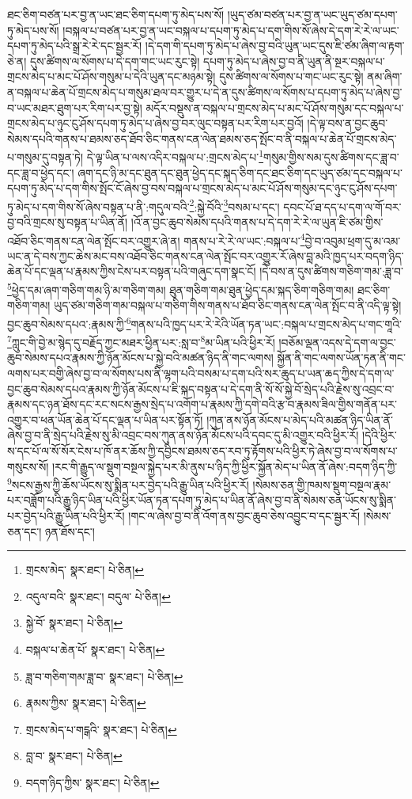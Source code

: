 ཐང་ཅིག་བཙན་པར་བྱ་ན་ཡང་ཐང་ཅིག་དཔག་ཏུ་མེད་པས་སོ། །ཡུད་ཙམ་བཙན་པར་བྱ་ན་ཡང་ཡུད་ཙམ་དཔག་ཏུ་མེད་པས་སོ། །བསྐལ་པ་བཙན་པར་བྱ་ན་ཡང་བསྐལ་པ་དཔག་ཏུ་མེད་པ་དག་གིས་སོ་ཞེས་དེ་དག་རེ་རེ་ལ་ཡང་དཔག་ཏུ་མེད་པའི་སྒྲ་རེ་རེ་དང་སྦྱར་རོ། །དེ་དག་གི་དཔག་ཏུ་མེད་པ་ཞེས་བྱ་བའི་ཡུན་ཡང་དུས་ཇི་ཙམ་ཞིག་ལ་རྟག་ཅེ་ན། དུས་ཚིགས་ལ་སོགས་པ་དེ་དག་གང་ཡང་རུང་སྟེ། དཔག་ཏུ་མེད་པ་ཞེས་བྱ་བ་ནི་ཡུན་ནི་སྔར་བསྐལ་པ་གྲངས་མེད་པ་མང་པོ་ཤོས་གསུམ་པ་དེའི་ཡུན་དང་མཉམ་སྟེ། དུས་ཚིགས་ལ་སོགས་པ་གང་ཡང་རུང་སྟེ། ནམ་ཞིག་ན་བསྐལ་པ་ཆེན་པོ་གྲངས་མེད་པ་གསུམ་ཐལ་བར་གྱུར་པ་དེ་ན་དུས་ཚིགས་ལ་སོགས་པ་དཔག་ཏུ་མེད་པ་ཞེས་བྱ་བ་ཡང་མཐར་ཐུག་པར་རིག་པར་བྱ་སྟེ། མདོར་བསྡུས་ན་བསྐལ་པ་གྲངས་མེད་པ་མང་པོ་ཤོས་གསུམ་དང་བསྐལ་པ་གྲངས་མེད་པ་ཉུང་ངུ་ཤོས་དཔག་ཏུ་མེད་པ་ཞེས་བྱ་བར་ལུང་བསྟན་པར་རིག་པར་བྱའོ། །དེ་ལྟ་བས་ན་བྱང་ཆུབ་སེམས་དཔའི་གནས་པ་ཐམས་ཅད་ཐོབ་ཅིང་གནས་ངན་ལེན་ཐམས་ཅད་སྤོང་བ་ནི་བསྐལ་པ་ཆེན་པོ་གྲངས་མེད་པ་གསུམ་དུ་བསྟན་ཏེ། དེ་ལྟ་ཡིན་པ་ལས་འདིར་བསྐལ་པ་:གྲངས་མེད་པ་\footnote{གྲངས་མེད་  སྣར་ཐང་།  པེ་ཅིན། }གསུམ་གྱིས་སམ་དུས་ཚིགས་དང་ཟླ་བ་དང་ཟླ་བ་ཕྱེད་དང་། ཞག་དང་ཉི་མ་དང་ཐུན་དང་ཐུན་ཕྱེད་དང་སྐད་ཅིག་དང་ཐང་ཅིག་དང་ཡུད་ཙམ་དང་བསྐལ་པ་དཔག་ཏུ་མེད་པ་དག་གིས་སྤོང་ངོ་ཞེས་བྱ་བས་བསྐལ་པ་གྲངས་མེད་པ་མང་པོ་ཤོས་གསུམ་དང་ཉུང་ངུ་ཤོས་དཔག་ཏུ་མེད་པ་དག་གིས་སོ་ཞེས་བསྟན་པ་ནི་:གདུལ་བའི་\footnote{འདུལ་བའི་  སྣར་ཐང་། བདུལ་  པེ་ཅིན། }:སྐྱེ་བོའི་\footnote{སྐྱེ་བོ་  སྣར་ཐང་།  པེ་ཅིན། }བསམ་པ་དང་། དབང་པོ་ཐ་དད་པ་དག་ལ་གོ་བར་བྱ་བའི་གྲངས་སུ་བསྟན་པ་ཡིན་ནོ། །འོ་ན་བྱང་ཆུབ་སེམས་དཔའི་གནས་པ་དེ་དག་རེ་རེ་ལ་ཡུན་ཇི་ཙམ་གྱིས་འཐོབ་ཅིང་གནས་ངན་ལེན་སྤོང་བར་འགྱུར་ཞེ་ན། གནས་པ་རེ་རེ་ལ་ཡང་:བསྐལ་པ་\footnote{བསྐལ་པ་ཆེན་པོ་  སྣར་ཐང་།  པེ་ཅིན། }བྱེ་བ་འབུམ་ཕྲག་དུ་མ་འམ་ཡང་ན་དེ་བས་ཀྱང་ཆེས་མང་བས་འཐོབ་ཅིང་གནས་ངན་ལེན་སྤོང་བར་འགྱུར་རོ་ཞེས་བླ་མའི་ཁྱད་པར་བདག་ཉིད་ཆེན་པོ་དང་ལྡན་པ་རྣམས་ཀྱིས་ངེས་པར་བསྟན་པའི་གཞུང་དག་སྣང་ངོ། །དེ་བས་ན་དུས་ཚིགས་གཅིག་གམ་:ཟླ་བ་\footnote{ཟླ་བ་གཅིག་གམ་ཟླ་བ་  སྣར་ཐང་།  པེ་ཅིན། }ཕྱེད་དམ་ཞག་གཅིག་གམ་ཉི་མ་གཅིག་གམ། ཐུན་གཅིག་གམ་ཐུན་ཕྱེད་དམ་སྐད་ཅིག་གཅིག་གམ། ཐང་ཅིག་གཅིག་གམ། ཡུད་ཙམ་གཅིག་གམ་བསྐལ་པ་གཅིག་གིས་གནས་པ་ཐོབ་ཅིང་གནས་ངན་ལེན་སྤོང་བ་ནི་འདི་ལྟ་སྟེ། བྱང་ཆུབ་སེམས་དཔའ་:རྣམས་ཀྱི་\footnote{རྣམས་ཀྱིས་  སྣར་ཐང་།  པེ་ཅིན། }གནས་པའི་ཁྱད་པར་རེ་རེའི་ཡོན་ཏན་ཡང་:བསྐལ་པ་གྲངས་མེད་པ་གང་གཱའི་\footnote{གྲངས་མེད་པ་གངྒའི་  སྣར་ཐང་།  པེ་ཅིན། }ཀླུང་གི་བྱེ་མ་སྙེད་དུ་བརྗོད་ཀྱང་མཐར་ཕྱིན་པར་:སླ་བ་\footnote{བླ་བ་  སྣར་ཐང་།  པེ་ཅིན། }མ་ཡིན་པའི་ཕྱིར་རོ། །བཅོམ་ལྡན་འདས་དེ་དག་ལ་བྱང་ཆུབ་སེམས་དཔའ་རྣམས་ཀྱི་ཉོན་མོངས་པ་སྐྱེ་བའི་མཚན་ཉིད་ནི་གང་ལགས། སྐྱོན་ནི་གང་ལགས་ཡོན་ཏན་ནི་གང་ལགས་པར་བགྱི་ཞེས་བྱ་བ་ལ་སོགས་པས་ནི་ལྷག་པའི་བསམ་པ་དག་པའི་སར་ཆུད་པ་ཡན་ཆད་ཀྱིས་དེ་དག་ལ་བྱང་ཆུབ་སེམས་དཔའ་རྣམས་ཀྱི་ཉོན་མོངས་པ་ཇི་སྐད་བསྟན་པ་དེ་དག་ནི་སོ་སོ་སྐྱེ་བོ་སྲེད་པའི་རྗེས་སུ་འབྲང་བ་རྣམས་དང་ཉན་ཐོས་དང་རང་སངས་རྒྱས་སྲེད་པ་འགོག་པ་རྣམས་ཀྱི་དགེ་བའི་རྩ་བ་རྣམས་ཟིལ་གྱིས་གནོན་པར་འགྱུར་བ་ཕན་ཡོན་ཆེན་པོ་དང་ལྡན་པ་ཡིན་པར་སྟོན་ཏོ། །ཀུན་ནས་ཉོན་མོངས་པ་མེད་པའི་མཚན་ཉིད་ཡིན་ནོ་ཞེས་བྱ་བ་ནི་སྲེད་པའི་རྗེས་སུ་མི་འབྲང་བས་ཀུན་ནས་ཉོན་མོངས་པའི་དབང་དུ་མི་འགྱུར་བའི་ཕྱིར་རོ། །དེའི་ཕྱིར་ས་དང་པོ་ལ་སོ་སོར་ངེས་པ་ཁོ་ནར་ཆོས་ཀྱི་དབྱིངས་ཐམས་ཅད་རབ་ཏུ་རྟོགས་པའི་ཕྱིར་ཏེ་ཞེས་བྱ་བ་ལ་སོགས་པ་གསུངས་སོ། །རང་གི་རྒྱུད་ལ་སྡུག་བསྔལ་སྐྱེད་པར་མི་ནུས་པ་ཉིད་ཀྱི་ཕྱིར་སྐྱོན་མེད་པ་ཡིན་ནོ་ཞེས་:བདག་ཉིད་ཀྱི་\footnote{བདག་ཉིད་ཀྱིས་  སྣར་ཐང་།  པེ་ཅིན། }སངས་རྒྱས་ཀྱི་ཆོས་ཡོངས་སུ་སྨིན་པར་བྱེད་པའི་རྒྱུ་ཡིན་པའི་ཕྱིར་རོ། །སེམས་ཅན་གྱི་ཁམས་སྡུག་བསྔལ་རྣམ་པར་བཟློག་པའི་རྒྱུ་ཉིད་ཡིན་པའི་ཕྱིར་ཡོན་ཏན་དཔག་ཏུ་མེད་པ་ཡིན་ནོ་ཞེས་བྱ་བ་ནི་སེམས་ཅན་ཡོངས་སུ་སྨིན་པར་བྱེད་པའི་རྒྱུ་ཡིན་པའི་ཕྱིར་རོ། །གང་ལ་ཞེས་བྱ་བ་ནི་འོག་ནས་བྱང་ཆུབ་ཅེས་འབྱུང་བ་དང་སྦྱར་རོ། །སེམས་ཅན་དང་། ཉན་ཐོས་དང་། 